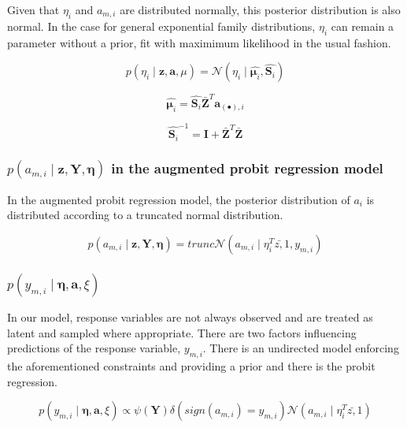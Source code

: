 \documentclass{article}
\begin{document}
Given that $\eta_{i}$ and $a_{m,i}$ are distributed normally, this
posterior distribution is also normal. In the case for general exponential
family distributions, $\eta_{i}$ can remain a parameter without a
prior, fit with maximimum likelihood in the usual fashion.

\begin{equation}
p\left(\eta_{i}\mid\mathbf{z},\mathbf{a},\mu\right)=\mathcal{N}\left(\eta_{i}\mid\hat{\mathbf{\mu}_{i}},\hat{\mathbf{S}_{i}}\right)\end{equation}


\[
\hat{\mathbf{\mu}_{i}}=\hat{\mathbf{S}_{i}}\bar{\mathbf{Z}}^{T}\mathbf{a}_{\left(\bullet\right),i}\]


\[
\hat{\mathbf{S}_{i}}^{-1}=\mathbf{I}+\bar{\mathbf{Z}}^{T}\bar{\mathbf{Z}}\]



\subsubsection{$p\left(a_{m,i}\mid\mathbf{z},\mathbf{Y},\mathbf{\eta}\right)$ in
the augmented probit regression model}

In the augmented probit regression model, the posterior distribution
of $a_{i}$ is distributed according to a truncated normal distribution.

\[
p\left(a_{m,i}\mid\mathbf{z},\mathbf{Y},\mathbf{\eta}\right)=trunc\mathcal{N}\left(a_{m,i}\mid\eta_{i}^{T}\bar{z,}1,y_{m,i}\right)\]



\subsubsection{\textmd{$p\left(y_{m,i}\mid\mathbf{\eta},\mathbf{a},\xi\right)$}}

In our model, response variables are not always observed and are treated
as latent and sampled where appropriate. There are two factors influencing
predictions of the response variable, $y_{m,i}$. There is an undirected
model enforcing the aforementioned constraints and providing a prior
and there is the probit regression. 

\begin{equation}
p\left(y_{m,i}\mid\mathbf{\eta},\mathbf{a},\xi\right)\propto\psi\left(\mathbf{Y}\right)\delta\left(sign\left(a_{m,i}\right)=y_{m,i}\right)\mathcal{N}\left(a_{m,i}\mid\eta_{i}^{T}\bar{z,}1\right)\end{equation}
\end{document}
